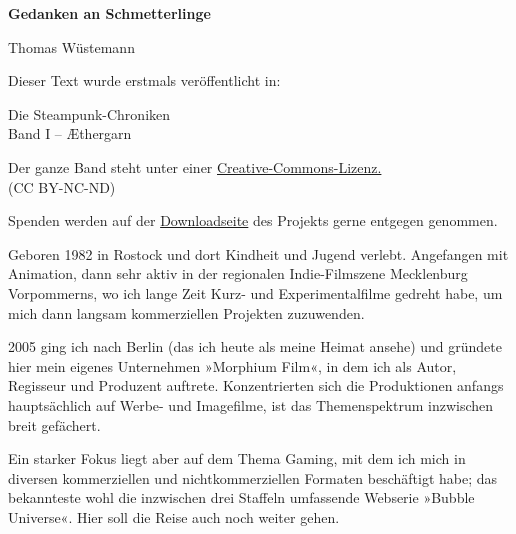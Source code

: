 \usepackage[ngerman]{babel}
\usepackage[T1]{fontenc}



\renewcommand*{\tb}{\begin{center}* \quad * \quad *\end{center}}

\newcommand\bigpar\medskip
\newcommand\gedanke\textit


\raggedbottom
\begin{center}
\textbf{\huge\textsf{Gedanken an Schmetterlinge}}

\bigskip
Thomas Wüstemann
\end{center}

\bigskip

\begin{flushleft}
Dieser Text wurde erstmals veröffentlicht in:
\begin{center}
Die Steampunk-Chroniken\\
Band I -- Æthergarn
\end{center}

\bigskip

Der ganze Band steht unter einer
\href{http://creativecommons.org/licenses/by-nc-nd/2.0/de/}{Creative-Commons-Lizenz.} \\
(CC BY-NC-ND)

\bigskip

Spenden werden auf der
\href{http://steampunk-chroniken.de/download}{Downloadseite}
des Projekts gerne entgegen genommen.

\vfill

Geboren 1982 in Rostock und dort Kindheit und Jugend verlebt.
Angefangen mit Animation, dann sehr aktiv in der regionalen
Indie-Filmszene Mecklenburg Vorpommerns, wo ich lange Zeit Kurz-
und Experimentalfilme gedreht habe, um mich dann langsam
kommerziellen Projekten zuzuwenden.

\bigpar

2005 ging ich nach Berlin (das ich heute als meine Heimat ansehe)
und gründete hier mein eigenes Unternehmen »Morphium Film«, in dem
ich als Autor, Regisseur und Produzent auftrete. Konzentrierten
sich die Produktionen anfangs hauptsächlich auf Werbe- und
Imagefilme, ist das Themenspektrum inzwischen breit gefächert.

Ein starker Fokus liegt aber auf dem Thema Gaming, mit dem ich mich
in diversen kommerziellen und nichtkommerziellen Formaten
beschäftigt habe; das bekannteste wohl die inzwischen drei Staffeln
umfassende Webserie »Bubble Universe«. Hier soll die Reise auch
noch weiter gehen.

\end{flushleft}
